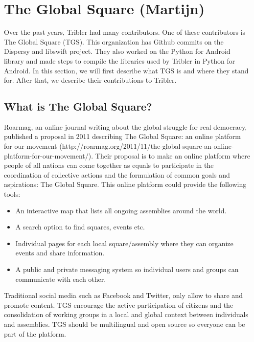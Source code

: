 \documentclass[11pt]{article}
\begin{document}
\section{The Global Square (Martijn)}
Over the past years, Tribler had many contributors. One of these contributors is The Global Square (TGS). This organization has Github commits on the Dispersy and libswift project. They also worked on the Python for Android library and made steps to compile the libraries used by Tribler in Python for Android. In this section, we will first describe what TGS is and where they stand for. After that, we describe their contributions to Tribler.

\subsection{What is The Global Square?}
Roarmag, an online journal writing about the global struggle for real democracy, published a proposal in 2011 describing The Global Square: an online platform for our movement (http://roarmag.org/2011/11/the-global-square-an-online-platform-for-our-movement/). Their proposal is to make an online platform where people of all nations can come together as equals to participate in the coordination of collective actions and the formulation of common goals and aspirations: The Global Square. This online platform could provide the following tools:
\begin{itemize}
\item An interactive map that lists all ongoing assemblies around the world.
\item A search option to find squares, events etc.
\item Individual pages for each local square/assembly where they can organize events and share information.
\item A public and private messaging system so individual users and groups can communicate with each other.
\end{itemize}
Traditional social media such as Facebook and Twitter, only allow to share and promote content. TGS encourage the active participation of citizens and the consolidation of working groups in a local and global context between individuals and assemblies. TGS should be multilingual and open source so everyone can be part of the platform.
\end{document}
